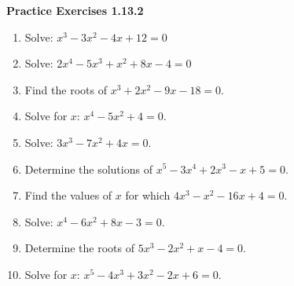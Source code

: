\vspace{0.3ex}
\noindent\textbf{Practice Exercises 1.13.2}

\vspace{0.2ex}

\begin{enumerate}
    \item Solve: $x^3 - 3x^2 - 4x + 12 = 0$
    \item Solve: $2x^4 - 5x^3 + x^2 + 8x - 4 = 0$
    \item Find the roots of $x^3 + 2x^2 - 9x - 18 = 0$.
    \item Solve for $x$: $x^4 - 5x^2 + 4 = 0$.
    \item Solve: $3x^3 - 7x^2 + 4x = 0$.
    \item Determine the solutions of $x^5 - 3x^4 + 2x^3 - x + 5 = 0$.
    \item Find the values of $x$ for which $4x^3 - x^2 - 16x + 4 = 0$.
    \item Solve: $x^4 - 6x^2 + 8x - 3 = 0$.
    \item Determine the roots of $5x^3 - 2x^2 + x - 4 = 0$.
    \item Solve for $x$: $x^5 - 4x^3 + 3x^2 - 2x + 6 = 0$.
\end{enumerate}
